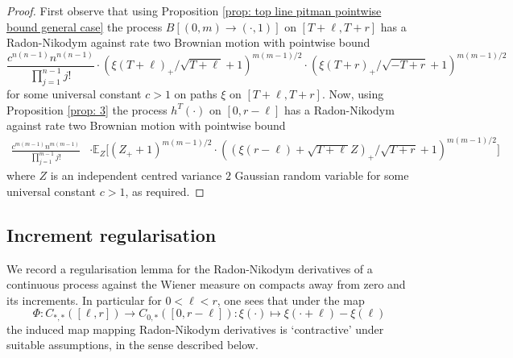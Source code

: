\documentclass[11pt, reqno]{amsart}
\numberwithin{equation}{section}
\begin{document}
\begin{proof}
First observe that using Proposition \ref{prop: top line pitman pointwise bound general case} the process $B[(0, m)\rightarrow (\cdot, 1)]$ on $[T+\ell,T+r]$ has a Radon-Nikodym  against rate two Brownian motion with pointwise bound
\begin{equation*}
    \frac{c^{n(n-1)}n^{n(n-1)}}{\prod_{j=1}^{n-1}j!}\cdot (\xi(T+\ell)_+/\sqrt{T+\ell}+1)^{m(m-1)/2}\cdot (\xi(T+r)_+/\sqrt{-T+r}+1)^{m(m-1)/2}
\end{equation*}
for some universal constant $c>1$ on paths $\xi$ on $[T+\ell, T+r]$. Now, using Proposition \ref{prop: 3} the process $h^T(\cdot)$ on $[0,r-\ell]$ has a Radon-Nikodym  against rate two Brownian motion with pointwise bound
 \begin{equation*}
    \begin{array}{cc}
    \frac{c^{m(m-1)}n^{m(m-1)}}{\prod_{j=1}^{m-1}j!}&\cdot \mathbb{E}_{Z}\Bigg[(Z_+ +1)^{m(m-1)/2}\cdot ((\xi(r-\ell)+\sqrt{T+\ell}Z)_+/\sqrt{T+r}+1)^{m(m-1)/2}\Bigg]
    \end{array}
\end{equation*}
where $Z$ is an independent centred variance $2$ Gaussian random variable for some universal constant $c>1$, as required.
\end{proof}
\subsection{Increment regularisation}\label{sec: inc reg}
We record a regularisation lemma for the Radon-Nikodym derivatives of a continuous process against the Wiener measure on compacts away from zero and its increments. In particular for $0<\ell<r$, one sees that under the map 
$$\Phi : C_{*,*}([\ell,r])\to  C_{0,*}([0,r-\ell]) : \xi(\cdot) \mapsto \xi(\cdot + \ell)-\xi (\ell)\label{eq: pushforward}$$
the induced map mapping Radon-Nikodym derivatives is `contractive' under suitable assumptions, in the sense described below.
\end{document}
